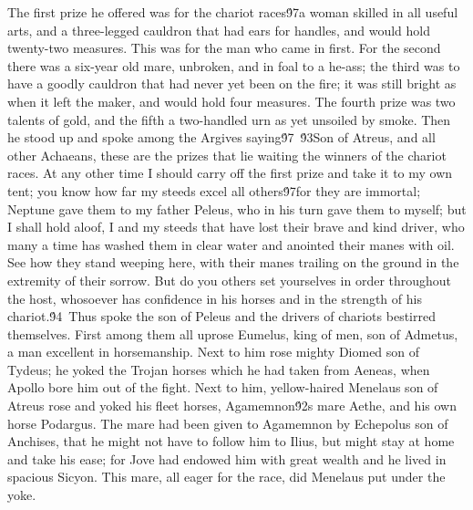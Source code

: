 {The first prize he offered was for the chariot races\'97a woman skilled in all useful arts, and a three-legged cauldron that had ears for handles, and would hold twenty-two measures. This was for the man who came in first. For the second there was a six-year old mare, unbroken, and in foal to a he-ass; the third was to have a goodly cauldron that had never yet been on the fire; it was still bright as when it left the maker, and would hold four measures. The fourth prize was two talents of gold, and the fifth a two-handled urn as yet unsoiled by smoke. Then he stood up and spoke among the Argives saying\'97\
\'93Son of Atreus, and all other Achaeans, these are the prizes that lie waiting the winners of the chariot races. At any other time I should carry off the first prize and take it to my own tent; you know how far my steeds excel all others\'97for they are immortal; Neptune gave them to my father Peleus, who in his turn gave them to myself; but I shall hold aloof, I and my steeds that have lost their brave and kind driver, who many a time has washed them in clear water and anointed their manes with oil. See how they stand weeping here, with their manes trailing on the ground in the extremity of their sorrow. But do you others set yourselves in order throughout the host, whosoever has confidence in his horses and in the strength of his chariot.\'94\
Thus spoke the son of Peleus and the drivers of chariots bestirred themselves. First among them all uprose Eumelus, king of men, son of Admetus, a man excellent in horsemanship. Next to him rose mighty Diomed son of Tydeus; he yoked the Trojan horses which he had taken from Aeneas, when Apollo bore him out of the fight. Next to him, yellow-haired Menelaus son of Atreus rose and yoked his fleet horses, Agamemnon\'92s mare Aethe, and his own horse Podargus. The mare had been given to Agamemnon by Echepolus son of Anchises, that he might not have to follow him to Ilius, but might stay at home and take his ease; for Jove had endowed him with great wealth and he lived in spacious Sicyon. This mare, all eager for the race, did Menelaus put under the yoke.\
}
